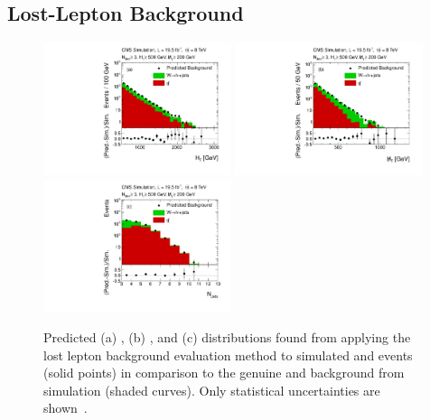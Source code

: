 \subsection{Lost-Lepton Background}
\label{subsec:RA2_lostlepton}
\begin{figure}[!t]
  \centering

  \begin{minipage}[c]{1.\textwidth}
    \begin{center}
      \includegraphics[width=0.49\textwidth]{figures/RA2_LL1.pdf}%
      \includegraphics[width=0.49\textwidth]{figures/RA2_LL2.pdf}\\ 
      \includegraphics[width=0.49\textwidth]{figures/RA2_LL3.pdf}
    \end{center}
  \end{minipage}

  \caption{Predicted (a) \HT, (b) \MHT, and (c) \NJets distributions found from applying the lost lepton background evaluation method to simulated \ttbar and \WJets events (solid points) in comparison to the genuine \ttbar and \WJets background from simulation (shaded curves). Only statistical uncertainties are shown~\cite{Chatrchyan:2014lfa}.}
  \label{fig:ra2_ll}
\end{figure}
